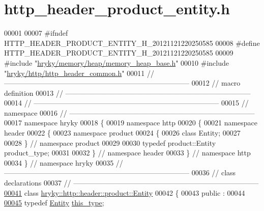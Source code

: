 \hypertarget{http__header__product__entity_8h_source}{\section{http\-\_\-header\-\_\-product\-\_\-entity.\-h}
}

\begin{DoxyCode}
00001 
00007 \textcolor{preprocessor}{#ifndef HTTP\_HEADER\_PRODUCT\_ENTITY\_H\_20121121220250585}
00008 \textcolor{preprocessor}{}\textcolor{preprocessor}{#define HTTP\_HEADER\_PRODUCT\_ENTITY\_H\_20121121220250585}
00009 \textcolor{preprocessor}{}\textcolor{preprocessor}{#include "\hyperlink{memory__heap__base_8h}{hryky/memory/heap/memory_heap_base.h}"}
00010 \textcolor{preprocessor}{#include "\hyperlink{http__header__common_8h}{hryky/http/http_header_common.h}"}
00011 \textcolor{comment}{//
      ------------------------------------------------------------------------------}
00012 \textcolor{comment}{// macro definition}
00013 \textcolor{comment}{//
      ------------------------------------------------------------------------------}
00014 \textcolor{comment}{//
      ------------------------------------------------------------------------------}
00015 \textcolor{comment}{// namespace}
00016 \textcolor{comment}{//
      ------------------------------------------------------------------------------}
00017 \textcolor{keyword}{namespace }hryky
00018 \{
00019 \textcolor{keyword}{namespace }http
00020 \{
00021 \textcolor{keyword}{namespace }header
00022 \{
00023 \textcolor{keyword}{namespace }product
00024 \{
00026     \textcolor{keyword}{class }Entity;
00027 
00028 \} \textcolor{comment}{// namespace product}
00029 
00030 \textcolor{keyword}{typedef} product::Entity product\_type;
00031 
00032 \} \textcolor{comment}{// namespace header}
00033 \} \textcolor{comment}{// namespace http}
00034 \} \textcolor{comment}{// namespace hryky}
00035 \textcolor{comment}{//
      ------------------------------------------------------------------------------}
00036 \textcolor{comment}{// class declarations}
00037 \textcolor{comment}{//
      ------------------------------------------------------------------------------}
\hypertarget{http__header__product__entity_8h_source_l00041}{}\hyperlink{classhryky_1_1http_1_1header_1_1product_1_1_entity}{00041} \textcolor{comment}{}\textcolor{keyword}{class }\hyperlink{classhryky_1_1http_1_1header_1_1product_1_1_entity}{hryky::http::header::product::Entity}
00042 \{
00043 \textcolor{keyword}{public} :
00044 
\hypertarget{http__header__product__entity_8h_source_l00045}{}\hyperlink{classhryky_1_1http_1_1header_1_1product_1_1_entity_a13c00263f0eaec564d5b8dad6b1fa5d6}{00045}     \textcolor{keyword}{typedef} \hyperlink{classhryky_1_1http_1_1header_1_1product_1_1_entity}{Entity}              \hyperlink{classhryky_1_1http_1_1header_1_1product_1_1_entity_a13c00263f0eaec564d5b8dad6b1fa5d6}{this_type};

\end{DoxyCode}
